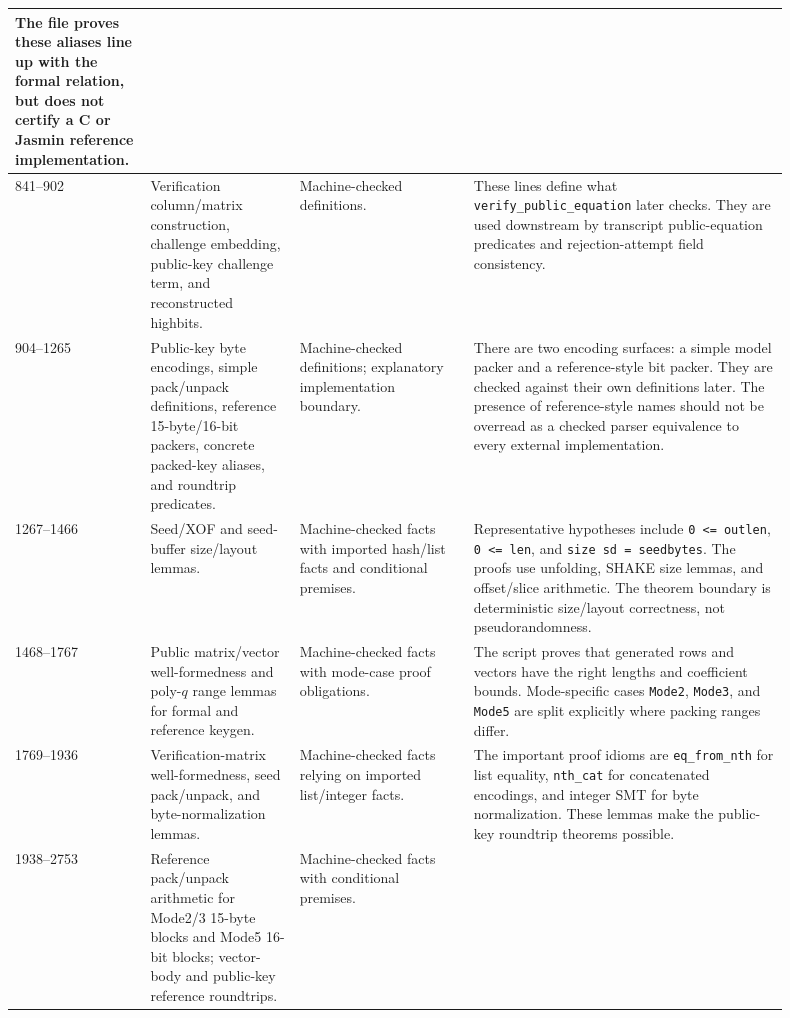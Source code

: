 \documentclass[11pt]{report}
\DeclareRobustCommand{\ec}[1]{\ifmmode\text{\nolinkurl{#1}}\else\nolinkurl{#1}\fi}
\theoremstyle{definition}
\theoremstyle{plain}
\begin{document}
\begin{longtable}{p{0.13\linewidth}p{0.18\linewidth}p{0.21\linewidth}p{0.38\linewidth}}
The file proves these aliases line up with the formal relation, but does not
certify a C or Jasmin reference implementation. \\
\midrule
841--902 &
Verification column/matrix construction, challenge embedding, public-key
challenge term, and reconstructed highbits. &
Machine-checked definitions. &
These lines define what \ec{verify\_public\_equation} later checks.  They are
used downstream by transcript public-equation predicates and rejection-attempt
field consistency. \\
\midrule
904--1265 &
Public-key byte encodings, simple pack/unpack definitions, reference
15-byte/16-bit packers, concrete packed-key aliases, and roundtrip predicates. &
Machine-checked definitions; explanatory implementation boundary. &
There are two encoding surfaces: a simple model packer and a reference-style
bit packer.  They are checked against their own definitions later.  The
presence of reference-style names should not be overread as a checked parser
equivalence to every external implementation. \\
\midrule
1267--1466 &
Seed/XOF and seed-buffer size/layout lemmas. &
Machine-checked facts with imported hash/list facts and conditional premises. &
Representative hypotheses include \ec{0 <= outlen}, \ec{0 <= len}, and
\ec{size sd = seedbytes}.  The proofs use unfolding, SHAKE size lemmas, and
offset/slice arithmetic.  The theorem boundary is deterministic size/layout
correctness, not pseudorandomness. \\
\midrule
1468--1767 &
Public matrix/vector well-formedness and poly-\(q\) range lemmas for formal and
reference keygen. &
Machine-checked facts with mode-case proof obligations. &
The script proves that generated rows and vectors have the right lengths and
coefficient bounds.  Mode-specific cases \ec{Mode2}, \ec{Mode3}, and
\ec{Mode5} are split explicitly where packing ranges differ. \\
\midrule
1769--1936 &
Verification-matrix well-formedness, seed pack/unpack, and byte-normalization
lemmas. &
Machine-checked facts relying on imported list/integer facts. &
The important proof idioms are \ec{eq\_from\_nth} for list equality,
\ec{nth\_cat} for concatenated encodings, and integer SMT for byte
normalization.  These lemmas make the public-key roundtrip theorems possible. \\
\midrule
1938--2753 &
Reference pack/unpack arithmetic for Mode2/3 15-byte blocks and Mode5 16-bit
blocks; vector-body and public-key reference roundtrips. &
Machine-checked facts with conditional premises. &

\end{longtable}
\end{document}
